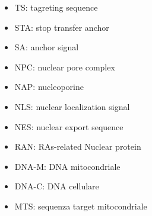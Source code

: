 \begin{itemize}
    \item TS: tagreting sequence
    \item STA: stop transfer anchor
    \item SA: anchor signal
    \item NPC: nuclear pore complex
    \item NAP: nucleoporine
    \item NLS: nuclear localization signal
    \item NES: nuclear export sequence
    \item RAN: RAs-related Nuclear protein
    \item DNA-M: DNA mitocondriale
    \item DNA-C: DNA cellulare
    \item MTS: sequenza target mitocondriale
\end{itemize}

